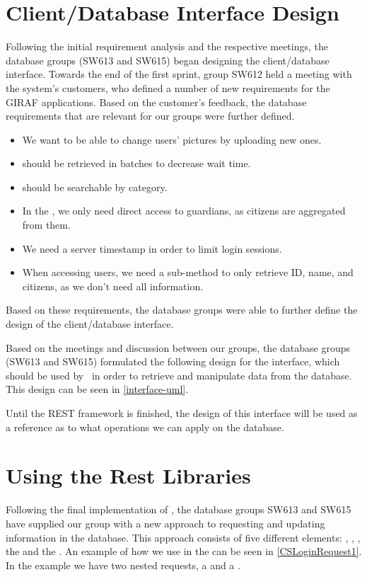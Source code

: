 \section{Client/Database Interface Design}
Following the initial requirement analysis and the respective meetings, the
database groups (SW613 and SW615) began designing the client/database interface.
Towards the end of the first sprint, group SW612 held a meeting with the
system's customers, who defined a number of new requirements for the GIRAF
applications. Based on the customer's feedback, the database requirements that
are relevant for our groups were further defined.

\begin{itemize}
  \item We want to be able to change users' pictures by uploading new ones.
  \item {} should be retrieved in batches to decrease wait time.
  \item {} should be searchable by category.
  \item In the , we only need direct access to guardians, as
  citizens are aggregated from them.
  \item We need a server timestamp in order to limit login sessions.
  \item When accessing users, we need a sub-method to only retrieve ID, name, and
  citizens, as we don't need all information.
\end{itemize}

Based on these requirements, the database groups were able to further define
the design of the client/database interface.\nl

Based on the meetings and discussion between our groups, the database groups
(SW613 and SW615) formulated the following design for the interface, which
should be used by \rlib\ in order to retrieve and
manipulate data from the database. This design can be seen in
\autoref{interface-uml}.


Until the REST framework is finished, the design of this interface will
be used as a reference as to what operations we can apply on the database.

\section{Using the Rest Libraries}\label{UsingRest}
Following the final implementation of \rlib, the database groups SW613 and SW615
have supplied our group with a new approach to requesting and updating
information in the database. This approach consists of five different elements:
, , , the
 and the .
An example of how we use  in the  can be seen
in \autoref{CSLoginRequest1}. In the example we have two nested requests, a
 and a .\nl

